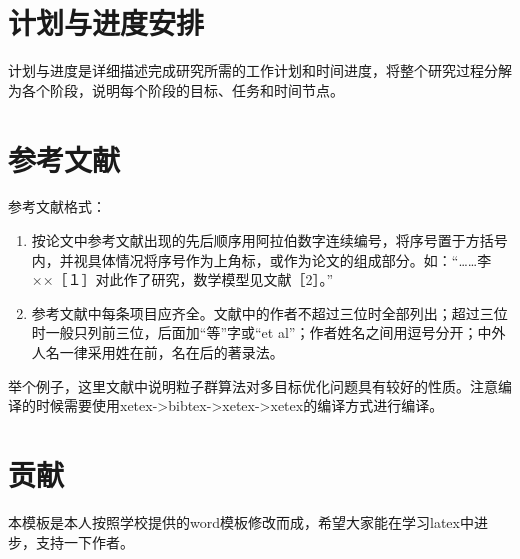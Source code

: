 \documentclass{suesreport}
\begin{document}
    \section{计划与进度安排}
    计划与进度是详细描述完成研究所需的工作计划和时间进度，将整个研究过程分解为各个阶段，说明每个阶段的目标、任务和时间节点。
    \section{参考文献}

    参考文献格式：
    \begin{enumerate}[label=\arabic*. ]
        \item 按论文中参考文献出现的先后顺序用阿拉伯数字连续编号，将序号置于方括号内，并视具体情况将序号作为上角标，或作为论文的组成部分。如：“……李××［１］对此作了研究，数学模型见文献［2］。”
        \item 参考文献中每条项目应齐全。文献中的作者不超过三位时全部列出；超过三位时一般只列前三位，后面加“等”字或“et al”；作者姓名之间用逗号分开；中外人名一律采用姓在前，名在后的著录法。
    \end{enumerate}

    举个例子，这里文献\citet{PSO_ZhangLibiao2004}中说明粒子群算法对多目标优化问题具有较好的性质。注意编译的时候需要使用xetex->bibtex->xetex->xetex的编译方式进行编译。
    \section{贡献}
    本模板是本人按照学校提供的word模板修改而成，希望大家能在学习latex中进步，支持一下作者。

    
    \nocite{*}
    
\end{document}
